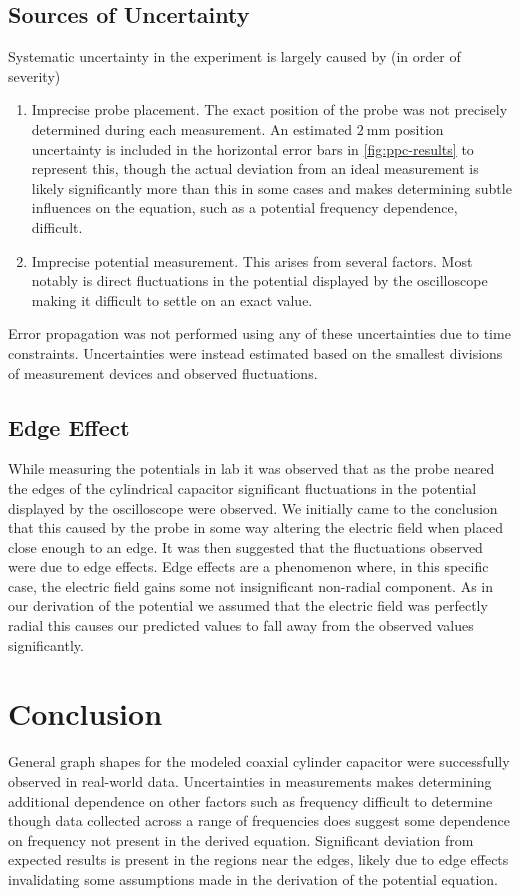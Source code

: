 \documentclass[10pt, twocolumn]{article}
\theoremstyle{definition}
\begin{document}
\subsection{Sources of Uncertainty}
Systematic uncertainty in the experiment is largely caused by (in order of severity)
\begin{enumerate}
  \item Imprecise probe placement. The exact position of the probe was not precisely determined during each measurement.
        An estimated $\qty{2}{\milli\meter}$ position uncertainty is included in the horizontal error bars in \ref{fig:ppc-results}
        to represent this, though the actual deviation from an ideal measurement is likely significantly more than this in some cases
        and makes determining subtle influences on the equation, such as a potential frequency dependence, difficult.
  \item Imprecise potential measurement. This arises from several factors. Most notably is direct fluctuations
        in the potential displayed by the oscilloscope making it difficult to settle on an exact value.
\end{enumerate}
Error propagation was not performed using any of these uncertainties due to time constraints. Uncertainties were instead estimated
based on the smallest divisions of measurement devices and observed fluctuations.
\subsection {Edge Effect}
While measuring the potentials in lab it was observed that as the probe neared the edges
of the cylindrical capacitor significant fluctuations in the potential displayed by the oscilloscope were observed.
We initially came to the conclusion that this caused
by the probe in some way altering the electric field when placed close enough to an edge.
It was then suggested that the fluctuations observed were due to edge effects. Edge effects are a phenomenon where,
in this specific case, the electric field gains some not insignificant non-radial component. As in our derivation
of the potential we assumed that the electric field was perfectly radial this causes our predicted values to fall away
from the observed values significantly.
\section{Conclusion}
General graph shapes for the modeled coaxial cylinder capacitor were successfully observed in real-world data. Uncertainties in measurements makes
determining additional dependence on other factors such as frequency difficult to determine though data collected across a range of frequencies
does suggest some dependence on frequency not present in the derived equation. Significant deviation from expected results is present in
the regions near the edges, likely due to edge effects invalidating some assumptions made in the derivation of the potential equation.
\end{document}
